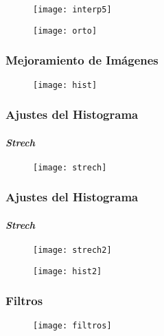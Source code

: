 \documentclass[14pt]{beamer}
\begin{document}
\begin{frame}
\scriptsize{}
  \begin{figure}
    \centering
    \texttt{[image: interp5]}
  \end{figure}
\end{frame}
\begin{frame}
\scriptsize{}
  \begin{figure}
    \centering
    \texttt{[image: orto]}
  \end{figure}
\end{frame}
\begin{frame}
\frametitle{Mejoramiento de Imágenes}
  \begin{figure}
    \centering
    \texttt{[image: hist]}
  \end{figure}
\tiny{}
\end{frame}
\begin{frame}
\frametitle{Ajustes del Histograma}
\framesubtitle{\emph{Strech}}
  \begin{figure}
    \centering
    \texttt{[image: strech]}
  \end{figure}
\tiny{}
\end{frame}
\begin{frame}
\frametitle{Ajustes del Histograma}
\framesubtitle{\emph{Strech}}
  \begin{figure}
    \centering
    \texttt{[image: strech2]}
  \end{figure}
\tiny{}
\end{frame}
\begin{frame}
  \begin{figure}
    \centering
    \texttt{[image: hist2]}
  \end{figure}
\tiny{}
\end{frame}
\begin{frame}
\frametitle{Filtros}
  \begin{figure}
    \centering
    \texttt{[image: filtros]}
  \end{figure}
\tiny{}
\end{frame}
\end{document}
